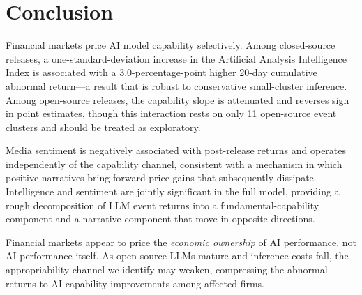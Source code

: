 \documentclass[12pt]{article}
\begin{document}
\section{Conclusion}
\label{sec:conclusion}

Financial markets price AI model capability selectively. Among closed-source
releases, a one-standard-deviation increase in the Artificial Analysis
Intelligence Index is associated with a 3.0-percentage-point higher 20-day
cumulative abnormal return---a result that is robust to conservative small-cluster
inference. Among open-source releases, the capability slope is attenuated and
reverses sign in point estimates, though this interaction rests on only 11
open-source event clusters and should be treated as exploratory.

Media sentiment is negatively associated with post-release returns and operates
independently of the capability channel, consistent with a mechanism in which
positive narratives bring forward price gains that subsequently dissipate.
Intelligence and sentiment are jointly significant in the full model, providing a
rough decomposition of LLM event returns into a fundamental-capability component
and a narrative component that move in opposite directions.

Financial markets appear to price the \emph{economic ownership} of AI performance,
not AI performance itself. As open-source LLMs mature and inference costs fall,
the appropriability channel we identify may weaken, compressing the abnormal
returns to AI capability improvements among affected firms.
\end{document}
